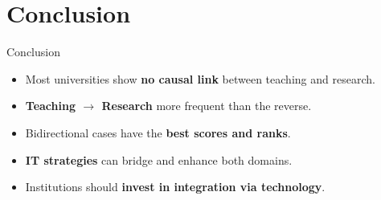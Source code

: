\documentclass[aspectratio=169, table]{beamer}
\begin{document}
\section{Conclusion}

\begin{frame}[fragile]{Conclusion}
	\vspace{20pt}
	\begin{itemize}
		\item Most universities show \textbf{no causal link} between teaching and research.
		\item \textbf{Teaching $\rightarrow$ Research} more frequent than the reverse.
		\item Bidirectional cases have the \textbf{best scores and ranks}.
		\item \textbf{IT strategies} can bridge and enhance both domains.
		\item Institutions should \textbf{invest in integration via technology}.
	\end{itemize}
\end{frame}
%
%
\end{document}
